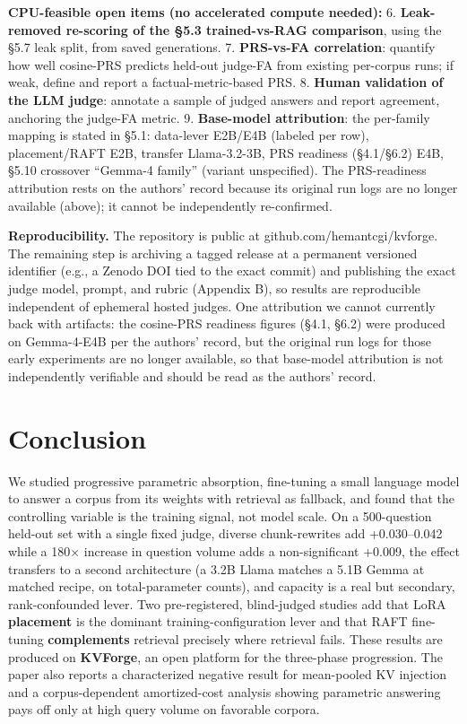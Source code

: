 \textbf{CPU-feasible open items (no accelerated compute needed):}
6. \textbf{Leak-removed re-scoring of the §5.3 trained-vs-RAG comparison}, using the §5.7 leak split, from saved generations.
7. \textbf{PRS-vs-FA correlation}: quantify how well cosine-PRS predicts held-out judge-FA from existing per-corpus runs; if weak, define and report a factual-metric-based PRS.
8. \textbf{Human validation of the LLM judge}: annotate a sample of judged answers and report agreement, anchoring the judge-FA metric.
9. \textbf{Base-model attribution}: the per-family mapping is stated in §5.1: data-lever E2B/E4B (labeled per row), placement/RAFT E2B, transfer Llama-3.2-3B, PRS readiness (§4.1/§6.2) E4B, §5.10 crossover ``Gemma-4 family'' (variant unspecified). The PRS-readiness attribution rests on the authors' record because its original run logs are no longer available (above); it cannot be independently re-confirmed.

\textbf{Reproducibility.} The repository is public at github.com/hemantcgi/kvforge. The remaining step is archiving a tagged release at a permanent versioned identifier (e.g., a Zenodo DOI tied to the exact commit) and publishing the exact judge model, prompt, and rubric (Appendix B), so results are reproducible independent of ephemeral hosted judges. One attribution we cannot currently back with artifacts: the cosine-PRS readiness figures (§4.1, §6.2) were produced on Gemma-4-E4B per the authors' record, but the original run logs for those early experiments are no longer available, so that base-model attribution is not independently verifiable and should be read as the authors' record.

\hypertarget{conclusion}{%
\section{Conclusion}\label{conclusion}}

We studied progressive parametric absorption, fine-tuning a small language model to answer a corpus from its weights with retrieval as fallback, and found that the controlling variable is the training signal, not model scale. On a 500-question held-out set with a single fixed judge, diverse chunk-rewrites add +0.030--0.042 while a 180× increase in question volume adds a non-significant +0.009, the effect transfers to a second architecture (a 3.2B Llama matches a 5.1B Gemma at matched recipe, on total-parameter counts), and capacity is a real but secondary, rank-confounded lever. Two pre-registered, blind-judged studies add that LoRA \textbf{placement} is the dominant training-configuration lever and that RAFT fine-tuning \textbf{complements} retrieval precisely where retrieval fails. These results are produced on \textbf{KVForge}, an open platform for the three-phase progression. The paper also reports a characterized negative result for mean-pooled KV injection and a corpus-dependent amortized-cost analysis showing parametric answering pays off only at high query volume on favorable corpora.

